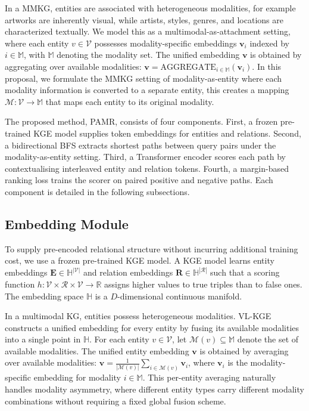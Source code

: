 \documentclass[runningheads]{llncs}
\begin{document}
In a MMKG, entities are associated with heterogeneous modalities, for example artworks are inherently visual, while artists,
styles, genres, and locations are characterized textually. We model
this as a multimodal-as-attachment setting, where each entity $v \in \mathcal{V}$
possesses modality-specific embeddings $\mathbf{v}_i$ indexed by
$i \in \mathbb{M}$, with $\mathbb{M}$ denoting the modality set.
The unified embedding $\mathbf{v}$ is obtained
by aggregating over available modalities: $\mathbf{v} =
\text{AGGREGATE}_{i \in \mathbb{M}} (\mathbf{v}_i)$. In this proposal, we formulate the MMKG setting of modality-as-entity where each modality information is converted to a separate entity, this creates a mapping $\mathcal{M}: \mathcal{V} \to \mathbb{M}$ that maps each entity to its original modality.

The proposed method, PAMR, consists of four components. First, a frozen
pre-trained KGE model supplies token embeddings for entities and relations.
Second, a bidirectional BFS extracts shortest paths between query pairs under the modality-as-entity setting.
Third, a Transformer encoder scores each path by contextualising
interleaved entity and relation tokens. Fourth, a margin-based ranking
loss trains the scorer on paired positive and negative paths. Each
component is detailed in the following subsections.

\subsection{Embedding Module}
\label{sec:embedding-module}

To supply pre-encoded relational structure without incurring additional
training cost, we use a frozen pre-trained KGE model.  A KGE model
learns entity embeddings $\mathbf{E} \in \mathbb{H}^{|\mathcal{V}|}$
and relation embeddings $\mathbf{R} \in \mathbb{H}^{|\mathcal{R}|}$
such that a scoring function $h: \mathcal{V} \times \mathcal{R} \times
\mathcal{V} \to \mathbb{R}$ assigns higher values to true triples
than to false ones.  The embedding space $\mathbb{H}$ is a
$D$-dimensional continuous manifold.

In a multimodal KG, entities possess heterogeneous modalities.
VL-KGE~\cite{efthymiou2026vlkge} constructs a unified embedding for
every entity by fusing its available modalities into a single point
in $\mathbb{H}$.  For each entity $v \in \mathcal{V}$, let
$\mathcal{M}(v) \subseteq \mathbb{M}$ denote the set of available
modalities.  The unified entity embedding $\mathbf{v}$ is obtained
by averaging over available modalities:
$\mathbf{v} = \frac{1}{|\mathcal{M}(v)|} \sum_{i \in \mathcal{M}(v)} \mathbf{v}_i$,
where $\mathbf{v}_i$ is the modality-specific embedding for modality
$i \in \mathbb{M}$.  This per-entity averaging naturally handles
modality asymmetry, where different entity types carry different
modality combinations without requiring a fixed global fusion scheme.
\end{document}

